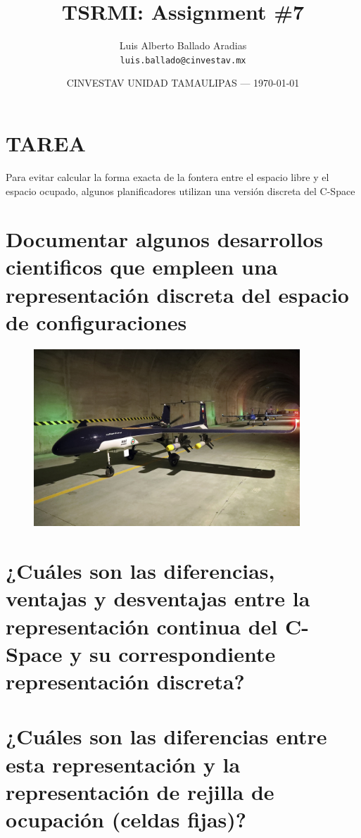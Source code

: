 \documentclass{article}
\title{TSRMI: Assignment \#7} %
\author{Luis Alberto Ballado Aradias\\ \texttt{luis.ballado@cinvestav.mx}} %
\date{CINVESTAV UNIDAD TAMAULIPAS --- \today} %
\begin{document}
\maketitle %


\section*{TAREA} %
Para evitar calcular la forma exacta de la fontera entre el espacio libre y el espacio ocupado, algunos planificadores utilizan una versión discreta del C-Space 


\section{Documentar algunos desarrollos cientificos que empleen una representación discreta del espacio de configuraciones}


\begin{figure}[h]
\includegraphics[width=10cm]{images/drone_alafija.jpg}
\centering
\end{figure}

\newpage
\section{¿Cuáles son las diferencias, ventajas y desventajas entre la representación continua del C-Space y su correspondiente representación discreta?}

\newpage
\section{¿Cuáles son las diferencias entre esta representación y la representación de rejilla de ocupación (celdas fijas)?}
\end{document}
